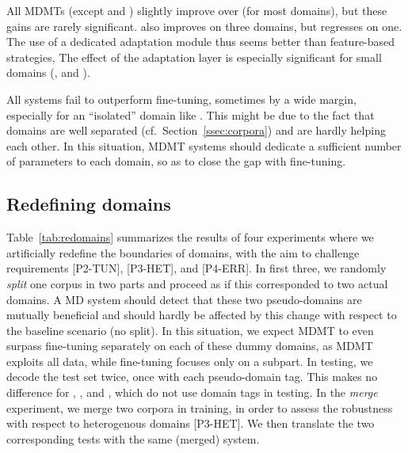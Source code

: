 All MDMTs (except  and ) slightly improve over (for most domains), but these gains are rarely significant.    also improves on three domains, but regresses on one. The use of a dedicated adaptation module thus seems better than feature-based strategies,  The effect of the adaptation layer is especially significant for small domains (,  and ).

All systems fail to outperform fine-tuning, sometimes by a wide margin, especially for an ``isolated'' domain like . This might be due to the fact that domains are well separated (cf.\ Section~\ref{ssec:corpora}) and are hardly helping each other. In this situation, MDMT systems should dedicate a sufficient number of parameters to each domain, so as to close the gap with fine-tuning.

\subsection{Redefining domains \label{ssec:redomains}}

Table~\ref{tab:redomains} summarizes the results of four experiments where we artificially redefine the boundaries of domains, with the aim to challenge requirements [P2-TUN], [P3-HET], and [P4-ERR]. In first three, we randomly \emph{split} one corpus in two parts and proceed as if this corresponded to two actual domains. A MD system should detect that these two pseudo-domains are mutually beneficial and should hardly be affected by this change with respect to the baseline scenario (no split). In this situation, we expect MDMT to even surpass fine-tuning separately on each of these dummy domains, as MDMT exploits all data, while fine-tuning focuses only on a subpart. In testing, we decode the test set twice, once with each pseudo-domain tag. This makes no difference for , ,  and , which do not use domain tags in testing.
In the \textsl{merge} experiment, we merge two corpora in training, in order to assess the robustness with respect to heterogenous domains [P3-HET]. We then translate the two corresponding tests with the same (merged) system.

